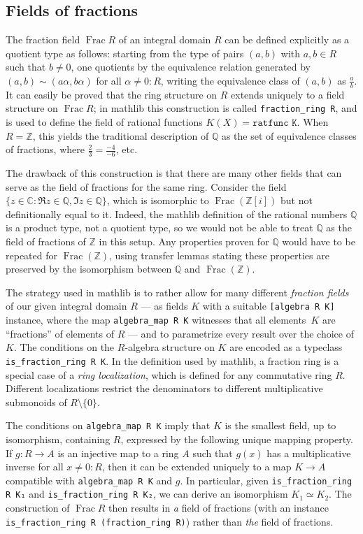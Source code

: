 \documentclass[sn-mathphys]{sn-jnl}%
\renewcommand{\C}{\mathbb{C}}
\newcommand{\lean}[1]{\texttt{#1}\xspace}
\newcommand{\mathlib}{\textsf{mathlib}\xspace}
\newcommand{\QQ}{\mathbb{Q}}
\renewcommand{\Z}{\mathbb{Z}}
\DeclareMathOperator{\Frac}{Frac}
\begin{document}
\subsection{Fields of fractions}\label{subsection : fields of fractions}
The fraction field $\Frac R$ of an integral domain $R$ can be defined explicitly as a quotient type as follows:
starting from the type of pairs $(a,b)$ with $a,b \in R$ such that $b\neq 0$,
one quotients by the equivalence relation generated by $(a,b) \sim (a \alpha, b \alpha)$ for all $\alpha \ne 0 : R$, writing the equivalence class of $(a,b)$ as $\frac{a}{b}$.
It can easily be proved that the ring structure on $R$ extends uniquely to a field structure on $\Frac R$;
in \mathlib this construction is called \mbox{\lean{fraction\_ring R}},
and is used to define the field of rational functions $K(X) = \lean{ratfunc K}$.
When $R=\Z$, this yields the traditional description of $\QQ$ as the set of equivalence classes of fractions, where $\frac{2}{3}=\frac{-4}{-6}$, etc.

The drawback of this construction is that there are many other fields that can serve as the field of fractions for the same ring.
Consider the field $\{z \in \C : \Re z \in \QQ, \Im z\in\QQ\}$, which is isomorphic to $\Frac (\Z[i])$ but not definitionally equal to it.
Indeed, the \mathlib definition of the rational numbers $\QQ$ is a product type, not a quotient type, so we would not be able to treat $\QQ$ as the field of fractions of $\Z$ in this setup.
Any properties proven for $\QQ$ would have to be repeated for $\Frac(\Z)$,
using transfer lemmas stating these properties are preserved by the isomorphism between $\QQ$ and $\Frac(\Z)$.

The strategy used in \mathlib is to rather allow for many different \emph{fraction fields} of our given integral domain $R$ --- as fields $K$ with a suitable \lean{[algebra R K]} instance, where the map \lean{algebra\_map R K} witnesses that all elements~$K$ are ``fractions'' of elements of $R$ --- and to parametrize every result over the choice of $K$.
The conditions on the $R$-algebra structure on $K$ are encoded as a typeclass \lean{is\_fraction\_ring R K}.
In the definition used by \mathlib, a fraction ring is a special case of a \emph{ring localization},
which is defined for any commutative ring $R$.
Different localizations restrict the denominators to different multiplicative submonoids of $R\setminus\{0\}$.

The conditions on \lean{algebra\_map R K} imply that $K$ is the smallest field, up to isomorphism, containing $R$, expressed by the following unique mapping property.
If $g \colon R \to A$ is an injective map to a ring $A$ such that $g(x)$ has a multiplicative inverse for all $x \ne 0 : R$, then
it can be extended uniquely to a map $K \to A$ compatible with \lean{algebra\_map R K} and $g$.
In particular, given \lean{is\_fraction\_ring R K₁} and \lean{is\_fraction\_ring R K₂}, we can derive an isomorphism $K_1 \simeq K_2$.
The construction of $\Frac R$ then results in \emph{a} field of fractions (with an instance \lean{is\_fraction\_ring R (fraction\_ring R)}) rather than \emph{the} field of fractions.
\end{document}
